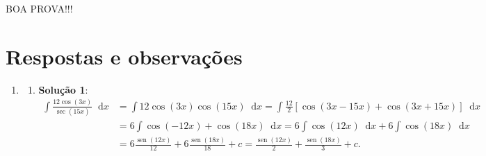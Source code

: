 \documentclass[12pt,a4paper]{article}
\newcommand*\diff{\mathop{}\!\mathrm{d}}
\newcommand*\sen{\operatorname{sen}}
\begin{document}
\begin{center}
BOA PROVA!!!
\end{center}

\newpage
\restoregeometry
\section*{Respostas e observações}
\begin{enumerate}
\item
\begin{enumerate}
\item \textbf{Solução 1}:
\begin{align*}
    \int \frac{12 \cos(3x)}{\sec(15x)} \diff x
& = \int 12 \cos(3x) \cos(15x) \diff x
  = \int \frac{12}{2}\left[ \cos(3x-15x) + \cos(3x+15x) \right] \diff x\\
& = 6 \int \cos(-12x) + \cos(18x) \diff x
  = 6 \int \cos(12x) \diff x + 6\int \cos(18x) \diff x\\
& = 6 \frac{ \sen(12x) }{12} + 6\frac{ \sen(18x) }{18} + c
  = \frac{ \sen(12x) }{2} + \frac{ \sen(18x) }{3} + c.
\end{align*}


\end{enumerate}
\end{enumerate}
\end{document}
